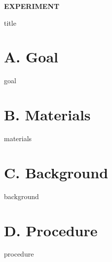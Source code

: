 \documentclass[cover.tex]{subfiles}
\begin{document}
 


\hfill\vspace{0.2cm}\begin{center}{\large \bfseries EXPERIMENT \thechapter\par\Huge
 {title}
 \\[5pt] \par}\vspace{0.2cm}\end{center}\par\noindent

 
 
\section*{A. Goal}
{goal}
\section*{B. Materials}
{materials}
\section*{C. Background}
{background}




\section*{D. Procedure}
{procedure}
\end{document}

